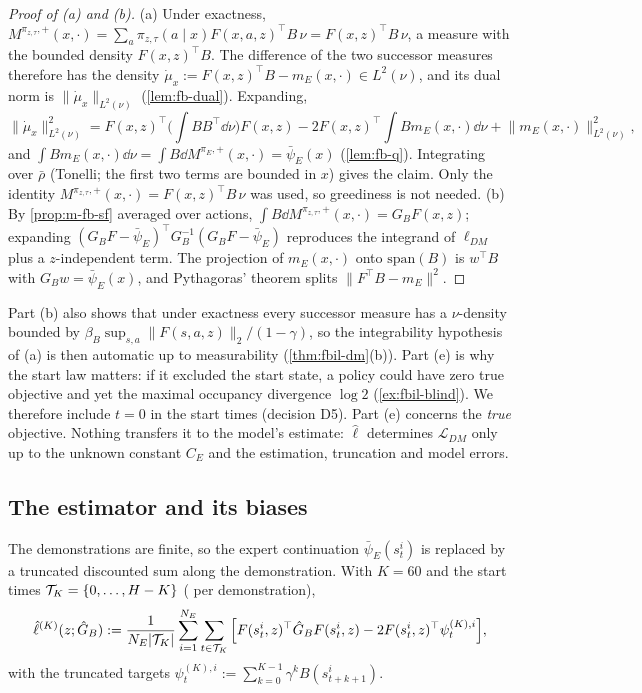 \begin{proof}[Proof of (a) and (b)]
(a) Under exactness, $M^{\pi_{z,\tau},+}(x,\cdot)=\sum_a\pi_{z,\tau}(a\mid x)F(x,a,z)^\top B\,\nu=F(x,z)^\top B\,\nu$, a measure with the bounded density $F(x,z)^\top B$. The difference of the two successor measures therefore has the density $\dot\mu_x:=F(x,z)^\top B-m_E(x,\cdot)\in L^2(\nu)$, and its dual norm is $\lVert\dot\mu_x\rVert_{L^2(\nu)}$ (\cref{lem:fb-dual}). Expanding,
\[
\lVert\dot\mu_x\rVert^2_{L^2(\nu)}=F(x,z)^\top\Big(\int BB^\top\dd\nu\Big)F(x,z)-2F(x,z)^\top\int Bm_E(x,\cdot)\dd\nu+\lVert m_E(x,\cdot)\rVert^2_{L^2(\nu)},
\]
and $\int Bm_E(x,\cdot)\dd\nu=\int B\dd M^{\pi_E,+}(x,\cdot)=\bar\psi_E(x)$ (\cref{lem:fb-q}). Integrating over $\bar\rho$ (Tonelli; the first two terms are bounded in $x$) gives the claim. Only the identity $M^{\pi_{z,\tau},+}(x,\cdot)=F(x,z)^\top B\,\nu$ was used, so greediness is not needed.
(b) By \cref{prop:m-fb-sf} averaged over actions, $\int B\dd M^{\pi_{z,\tau},+}(x,\cdot)=G_BF(x,z)$; expanding $(G_BF-\bar\psi_E)^\top G_B^{-1}(G_BF-\bar\psi_E)$ reproduces the integrand of $\ell_{DM}$ plus a $z$-independent term. The projection of $m_E(x,\cdot)$ onto $\mathrm{span}(B)$ is $w^\top B$ with $G_Bw=\bar\psi_E(x)$, and Pythagoras' theorem splits $\lVert F^\top B-m_E\rVert^2$.
\end{proof}

Part (b) also shows that under exactness every successor measure has a $\nu$-density bounded by $\beta_B\sup_{s,a}\lVert F(s,a,z)\rVert_2/(1-\gamma)$, so the integrability hypothesis of (a) is then automatic up to measurability (\cref{thm:fbil-dm}(b)).
Part (e) is why the start law matters: if it excluded the start state, a policy could have zero true objective and yet the maximal occupancy divergence $\log2$ (\cref{ex:fbil-blind}). We therefore include $t=0$ in the start times (decision D5).
Part (e) concerns the \emph{true} objective. Nothing transfers it to the model's estimate: $\hat\ell$ determines $\mathcal L_{DM}$ only up to the unknown constant $C_E$ and the estimation, truncation and model errors.

\subsection{The estimator and its biases}

The demonstrations are finite, so the expert continuation $\bar\psi_E(s^i_t)$ is replaced by a truncated discounted sum along the demonstration. With $K=60$ and the start times $\mathcal{T}_K=\{0,\dots,H-K\}$ ( per demonstration),
\begin{equation}\label{eq:m-dm-est}
\hat\ell^{(K)}(z;\hat G_B):=\frac1{N_E\lvert\mathcal{T}_K\rvert}\sum_{i=1}^{N_E}\sum_{t\in\mathcal{T}_K}\Big[F(s^i_t,z)^\top\hat G_BF(s^i_t,z)-2F(s^i_t,z)^\top\psi^{(K),i}_t\Big],
\end{equation}
with the truncated targets $\psi^{(K),i}_t:=\sum_{k=0}^{K-1}\gamma^kB(s^i_{t+k+1})$.

